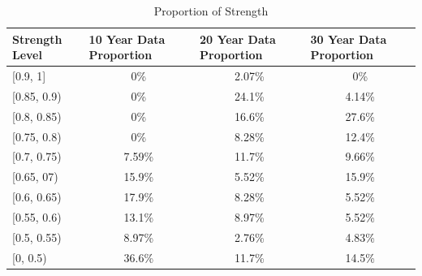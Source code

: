 \bigskip
\begin{table}[hb]
		\caption{Proportion of Strength }
	\begin{tabular}{lccc}
\hline
		\hline
		Strength Level & \multicolumn{1}{l}{10 Year Data Proportion} & \multicolumn{1}{l}{20 Year Data Proportion} & \multicolumn{1}{l}{30 Year Data Proportion} \\ \hline
		{[}0.9, 1{]}   & 0\%                                         & 2.07\%                                      & 0\%                                         \\
		{[}0.85, 0.9)  & 0\%                                         & 24.1\%                                      & 4.14\%                                      \\
		{[}0.8, 0.85)  & 0\%                                         & 16.6\%                                      & 27.6\%                                      \\
		{[}0.75, 0.8)  & 0\%                                         & 8.28\%                                      & 12.4\%                                      \\
		{[}0.7, 0.75)  & 7.59\%                                      & 11.7\%                                      & 9.66\%                                      \\
		{[}0.65, 07)   & 15.9\%                                      & 5.52\%                                      & 15.9\%                                      \\
		{[}0.6, 0.65)  & 17.9\%                                      & 8.28\%                                      & 5.52\%                                      \\
		{[}0.55, 0.6)  & 13.1\%                                      & 8.97\%                                      & 5.52\%                                      \\
		{[}0.5, 0.55)  & 8.97\%                                      & 2.76\%                                      & 4.83\%                                      \\
		{[}0, 0.5)     & 36.6\%                                      & 11.7\%                                      & 14.5\%                                      \\ \hline\hline
	\end{tabular}
\end{table}


